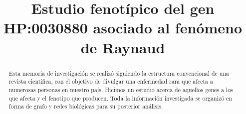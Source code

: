 \documentclass{bmcart}
\begin{document}
	\begin{frontmatter}
	
		\begin{fmbox}
			
			
			\title{Estudio fenotípico del gen HP:0030880 asociado al fenómeno de Raynaud}
			
			
			\author[
			  addressref={aff1},                   %
			  corref={aff1},                       %
			  email={jaldanam21@uma.es}   %
			]{ } %
			\author[
			  addressref={aff1},
			  email={juancaruru@uma.es}
			]{ }
			
			
			\address[id=aff1]{%
			  ,             %
			  ,          %
			  ,                              %
		}
		
		\end{fmbox}%
		
		\begin{abstractbox}
		
			\begin{abstract} %
			
			Esta memoria de investigación se realizó siguiendo la estructura convencional de una revista científica, con el objetivo de divulgar una enfermedad rara que afecta a numerosas personas en nuestro país. Hicimos un estudio acerca de aquellos genes a los que afecta y el fenotipo que producen. Toda la información investigada se organizó en forma de grafo y redes biológicas para su posterior análisis.
						

\end{abstract}
\end{abstractbox}
\end{frontmatter}
\end{document}
